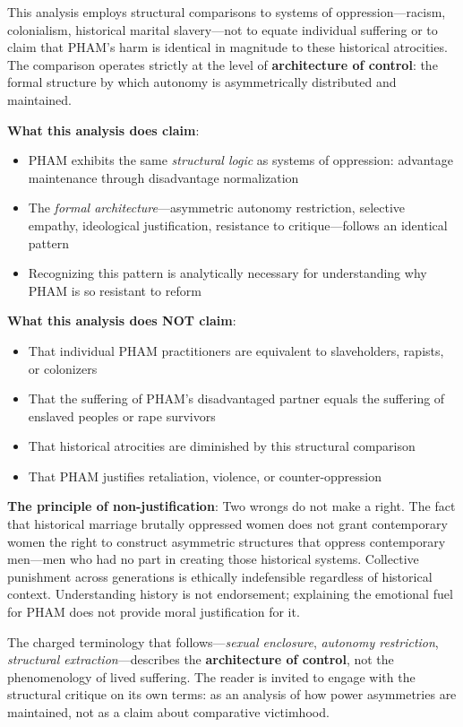 \documentclass[12pt,openany]{book}
\numberwithin{equation}{chapter}
\begin{document}
This analysis employs structural comparisons to systems of oppression---racism, colonialism, historical marital slavery---not to equate individual suffering or to claim that PHAM's harm is identical in magnitude to these historical atrocities. The comparison operates strictly at the level of \textbf{architecture of control}: the formal structure by which autonomy is asymmetrically distributed and maintained.

\textbf{What this analysis does claim}:
\begin{itemize}
    \item PHAM exhibits the same \textit{structural logic} as systems of oppression: advantage maintenance through disadvantage normalization
    \item The \textit{formal architecture}---asymmetric autonomy restriction, selective empathy, ideological justification, resistance to critique---follows an identical pattern
    \item Recognizing this pattern is analytically necessary for understanding why PHAM is so resistant to reform
\end{itemize}

\textbf{What this analysis does NOT claim}:
\begin{itemize}
    \item That individual PHAM practitioners are equivalent to slaveholders, rapists, or colonizers
    \item That the suffering of PHAM's disadvantaged partner equals the suffering of enslaved peoples or rape survivors
    \item That historical atrocities are diminished by this structural comparison
    \item That PHAM justifies retaliation, violence, or counter-oppression
\end{itemize}

\textbf{The principle of non-justification}: Two wrongs do not make a right. The fact that historical marriage brutally oppressed women does not grant contemporary women the right to construct asymmetric structures that oppress contemporary men---men who had no part in creating those historical systems. Collective punishment across generations is ethically indefensible regardless of historical context. Understanding history is not endorsement; explaining the emotional fuel for PHAM does not provide moral justification for it.

The charged terminology that follows---\textit{sexual enclosure}, \textit{autonomy restriction}, \textit{structural extraction}---describes the \textbf{architecture of control}, not the phenomenology of lived suffering. The reader is invited to engage with the structural critique on its own terms: as an analysis of how power asymmetries are maintained, not as a claim about comparative victimhood.
\end{document}
